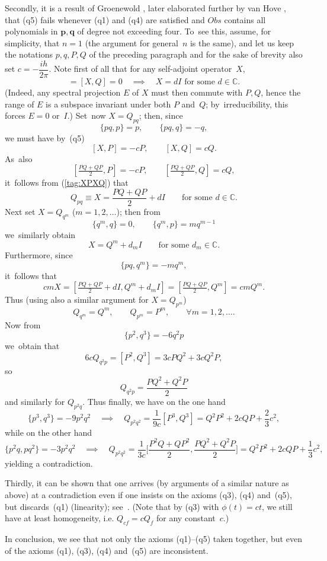 \documentclass[11pt]{amsart}
\numberwithin{equation}{section}
\theoremstyle{remark}
\newcommand\Obs{Obs}
\newcommand{\CC}{\C}
\newcommand{\bp}{\mathbf p}
\newcommand{\bq}{\mathbf q}
\newcommand{\C}{\mathbb C}
\begin{document}
Secondly, it is a result of Groenewold \cite{bib:Groe}, later elaborated
further by van Hove \cite{bib:vHove}, that (q5) fails whenever (q1) and (q4)
are satisfied and $\Obs$ contains all polynomials in $\bp,\bq$ of degree not
exceeding four. To~see this, assume, for simplicity, that $n=1$ (the argument
for general~$n$ is the same), and let us keep the notations $p,q,P,Q$ of the
preceding paragraph and for the sake of brevity also set $c=-\dfrac{ih}{2\pi}$.
Note first of all that for any self-adjoint operator~$X$,
\begin{equation}  [X,P]=[X,Q]=0 \quad\implies\quad X=dI\text{ for some }
d\in\CC. \label{tag:XPXQ} \end{equation}
(Indeed, any spectral projection $E$ of $X$ must then commute with $P,Q$, hence
the range of $E$ is a subspace invariant under both $P$ and~$Q$;
by~irreducibility, this forces $E=0$ or~$I$.) Set~now $X=Q_{pq}$; then, since
$$ \{pq,p\}=p, \qquad \{pq,q\}=-q,  $$
we must have by~(q5)
$$ [X,P]=-cP, \qquad [X,Q]=cQ.  $$
As~also
$$ [ \tfrac{PQ+QP}2,P]=-cP, \qquad [\tfrac{PQ+QP}2,Q]=cQ,  $$
it~follows from (\ref{tag:XPXQ}) that
$$ Q_{pq} \equiv X = \frac{PQ+QP}2 + d I \qquad\text{for some }d\in\CC.  $$
Next set $X=Q_{q^m}$ ($m=1,2,\dots$); then from
$$ \{q^m,q\}=0, \qquad \{q^m,p\}=m q^{m-1}  $$
we~similarly obtain
$$ X=Q^m + d_m I \qquad\text{for some }d_m\in\CC.  $$
Furthermore, since
$$ \{pq,q^m\}= - m q^m,  $$
it~follows that
$$ cmX=[\tfrac{PQ+QP}2+dI,Q^m+d_m I] = [\tfrac{PQ+QP}2,Q^m] =cm Q^m.  $$
Thus (using also a similar argument for $X=Q_{p^m}$)
$$ Q_{q^m} = Q^m, \qquad Q_{p^m}=P^m, \qquad \forall m=1,2,\dots.  $$
Now from
$$ \{ p^2,q^3 \} = - 6q^2 p  $$
we~obtain that
$$ 6c Q_{q^2 p} = [P^2,Q^3] = 3c P Q^2+3c Q^2 P ,  $$
so
$$ Q_{q^2 p} = \frac{PQ^2+Q^2P}2  $$
and similarly for $Q_{p^2 q}$. Thus finally, we have on the one hand
$$ \{p^3,q^3\}=- 9p^2 q^2 \quad\implies\quad Q_{p^2 q^2} = \frac1{9c} [P^3,Q^3]
= Q^2 P^2 +2c QP + \frac23 c^2,  $$
while on the other hand
$$ \{p^2 q,p q^2\} = - 3 p^2 q^2 \quad\implies\quad Q_{p^2 q^2}= \frac1{3c}
\Big[\frac{P^2Q+QP^2}2,\frac{PQ^2+Q^2P}2\Big] = Q^2 P^2+2c QP+ \frac13c^2,  $$
yielding a contradiction.

Thirdly, it can be shown that one arrives (by arguments of a similar nature as
above) at a contradiction even if one insists on the axioms (q3), (q4)
and~(q5), but discards~(q1) (linearity); see~\cite{bib:ETuy}. (Note that
by (q3) with  $\phi(t)=c t$, we still have at least homogeneity, i.e. $Q_{cf}=c
Q_f$ for any constant~$c$.)

In conclusion, we  see that not only the axioms (q1)--(q5) taken together,
but even   of the axioms (q1), (q3), (q4)
and~(q5) are inconsistent.
\end{document}
